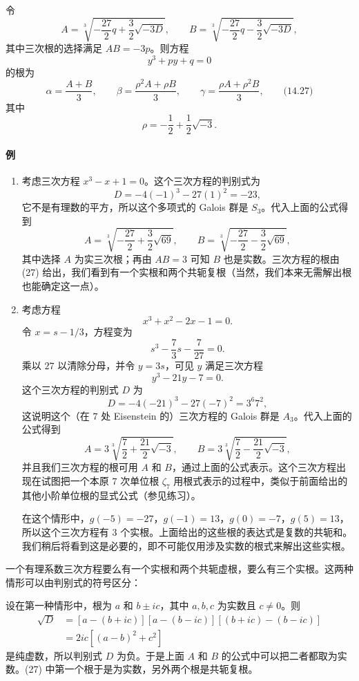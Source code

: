 令
\[
A=\sqrt[3]{-\frac{27}{2}q+\frac32\sqrt{-3D}},
\qquad
B=\sqrt[3]{-\frac{27}{2}q-\frac32\sqrt{-3D}},
\]
其中三次根的选择满足 $AB=-3p$。则方程
\[
y^3+py+q=0
\]
的根为
\[
\alpha=\frac{A+B}{3},
\qquad
\beta=\frac{\rho^2A+\rho B}{3},
\qquad
\gamma=\frac{\rho A+\rho^2B}{3}, \qquad\text{(14.27)}
\]
其中
\[
\rho=-\frac12+\frac12\sqrt{-3}.
\]

\paragraph{例}
\begin{enumerate}[label=(\arabic*)]
\item 考虑三次方程 $x^3-x+1=0$。这个三次方程的判别式为
\[
D=-4(-1)^3-27(1)^2=-23,
\]
它不是有理数的平方，所以这个多项式的 Galois 群是 $S_3$。代入上面的公式得到
\[
A=\sqrt[3]{-\frac{27}{2}+\frac32\sqrt{69}},
\qquad
B=\sqrt[3]{-\frac{27}{2}-\frac32\sqrt{69}},
\]
其中选择 $A$ 为实三次根；再由 $AB=3$ 可知 $B$ 也是实数。三次方程的根由 (27) 给出，我们看到有一个实根和两个共轭复根（当然，我们本来无需解出根也能确定这一点）。

\item 考虑方程
\[
x^3+x^2-2x-1=0.
\]
令 $x=s-1/3$，方程变为
\[
s^3-\frac73s-\frac7{27}=0.
\]
乘以 $27$ 以清除分母，并令 $y=3s$，可见 $y$ 满足三次方程
\[
y^3-21y-7=0.
\]
这个三次方程的判别式 $D$ 为
\[
D=-4(-21)^3-27(-7)^2=3^6 7^2,
\]
这说明这个（在 $7$ 处 Eisenstein 的）三次方程的 Galois 群是 $A_3$。代入上面的公式得到
\[
A=3\sqrt[3]{\frac72+\frac{21}{2}\sqrt{-3}},
\qquad
B=3\sqrt[3]{\frac72-\frac{21}{2}\sqrt{-3}},
\]
并且我们三次方程的根可用 $A$ 和 $B$，通过上面的公式表示。这个三次方程出现在试图把一个本原 $7$ 次单位根 $\zeta_7$ 用根式表示的过程中，类似于前面给出的其他小阶单位根的显式公式（参见练习）。

在这个情形中，$g(-5)=-27$，$g(-1)=13$，$g(0)=-7$，$g(5)=13$，所以这个三次方程有 $3$ 个实根。上面给出的这些根的表达式是复数的共轭和。我们稍后将看到这是必要的，即不可能仅用涉及实数的根式来解出这些实根。
\end{enumerate}

一个有理系数三次方程要么有一个实根和两个共轭虚根，要么有三个实根。这两种情形可以由判别式的符号区分：

设在第一种情形中，根为 $a$ 和 $b\pm ic$，其中 $a,b,c$ 为实数且 $c\neq 0$。则
\[
\begin{aligned}
\sqrt D&=[a-(b+ic)][a-(b-ic)][(b+ic)-(b-ic)]\\
&=2ic[(a-b)^2+c^2]
\end{aligned}
\]
是纯虚数，所以判别式 $D$ 为负。于是上面 $A$ 和 $B$ 的公式中可以把二者都取为实数。(27) 中第一个根于是为实数，另外两个根是共轭复根。

